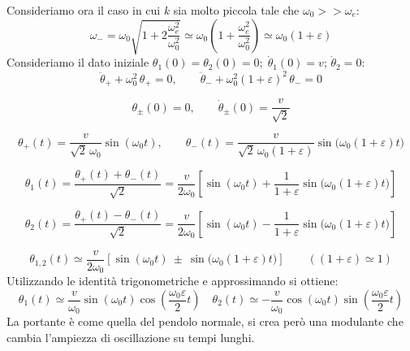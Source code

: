 Consideriamo ora il caso in cui $k$ sia molto piccola tale che $\omega_0>>\omega_e $:
\begin{equation}
    \omega_-= \omega_0\sqrt{1+2\frac{\omega_e^2}{\omega_0^2}}\simeq \omega_0\left( 1+\frac{\omega_e^2}{\omega_0^2} \right)\simeq \omega_0(1+\varepsilon)
\end{equation}
Consideriamo il dato iniziale $\theta_1(0)=\theta_2(0)=0;\;\dot{\theta}_1(0)=v;\,\dot{\theta}_2=0:$
\begin{equation}
    \ddot{\theta}_+ + \omega_0^2\,\theta_+ = 0,
    \qquad
    \ddot{\theta}_- + \omega_0^2(1+\varepsilon)^2\,\theta_- = 0
\end{equation}

\begin{equation}
    \theta_\pm(0)=0,
    \qquad
    \dot{\theta}_\pm(0)=\frac{v}{\sqrt{2}}
\end{equation}

\begin{equation}
    \theta_+(t)=\frac{v}{\sqrt{2}\,\omega_0}\sin(\omega_0 t),
    \qquad
    \theta_-(t)=\frac{v}{\sqrt{2}\,\omega_0(1+\varepsilon)}\sin\!\big(\omega_0(1+\varepsilon)t\big)
\end{equation}

\begin{equation*}
    \theta_1(t)=\frac{\theta_+(t)+\theta_-(t)}{\sqrt{2}}
    =\frac{v}{2\omega_0}\!\left[\sin(\omega_0 t)+\frac{1}{1+\varepsilon}\sin\!\big(\omega_0(1+\varepsilon)t\big)\right]
\end{equation*}

\begin{equation*}
    \theta_2(t)=\frac{\theta_+(t)-\theta_-(t)}{\sqrt{2}}
    =\frac{v}{2\omega_0}\!\left[\sin(\omega_0 t)-\frac{1}{1+\varepsilon}\sin\!\big(\omega_0(1+\varepsilon)t\big)\right]
\end{equation*}

\begin{equation*}
    \theta_{1,2}(t)\simeq \frac{v}{2\omega_0}\!\left[\sin(\omega_0 t)\ \pm\ \sin\!\big(\omega_0(1+\varepsilon)t\big)\right]
    \qquad ((1+\varepsilon)\simeq 1)
\end{equation*}
Utilizzando le identità trigonometriche e approssimando si ottiene:
\begin{equation}
    \theta_1(t)\simeq \frac{v}{\omega_0}\sin(\omega_0 t)\cos(\frac{\omega_0\varepsilon}{2}t)
    \quad \theta_2(t)\simeq- \frac{v}{\omega_0}\cos(\omega_0 t )\sin(\frac{\omega_0\varepsilon}{2}t)
\end{equation}
La portante è come quella del pendolo normale, si crea però una modulante che cambia l'ampiezza di oscillazione su tempi lunghi.